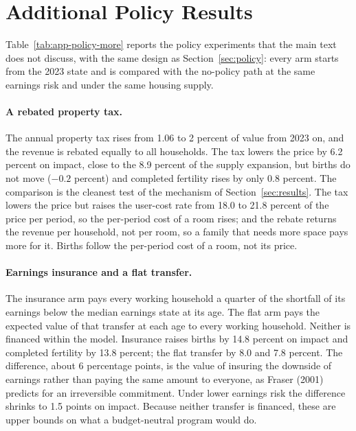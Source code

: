 \section{Additional Policy Results}
\label{app:policy-more}

Table~\ref{tab:app-policy-more} reports the policy experiments that the main
text does not discuss, with the same design as Section~\ref{sec:policy}: every
arm starts from the 2023 state and is compared with the no-policy path at the
same earnings risk and under the same housing supply.

\paragraph{A rebated property tax.} The annual property tax rises from 1.06 to
2 percent of value from 2023 on, and the revenue is rebated equally to all
households. The tax lowers the price by 6.2 percent on impact, close to the
8.9 percent of the supply expansion, but births do not move ($-0.2$ percent)
and completed fertility rises by only 0.8 percent. The comparison is the
cleanest test of the mechanism of Section~\ref{sec:results}. The tax lowers
the price but raises the user-cost rate from 18.0 to 21.8 percent of the price
per period, so the per-period cost of a room rises; and the rebate returns the
revenue per household, not per room, so a family that needs more space pays
more for it. Births follow the per-period cost of a room, not its price.

\paragraph{Earnings insurance and a flat transfer.} The insurance arm pays
every working household a quarter of the shortfall of its earnings below the
median earnings state at its age. The flat arm pays the expected value of that
transfer at each age to every working household. Neither is financed within
the model. Insurance raises births by 14.8 percent on impact and completed
fertility by 13.8 percent; the flat transfer by 8.0 and 7.8 percent. The
difference, about 6 percentage points, is the value of insuring the downside
of earnings rather than paying the same amount to everyone, as Fraser (2001)
predicts for an irreversible commitment. Under lower earnings risk the
difference shrinks to 1.5 points on impact. Because neither transfer is
financed, these are upper bounds on what a budget-neutral program would do.

